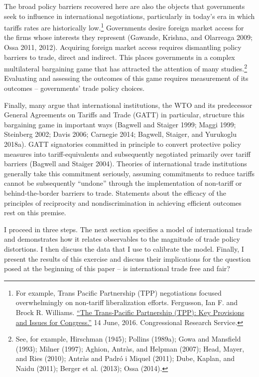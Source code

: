 \documentclass{puthesis}
\begin{document}
The broad policy barriers recovered here are also the objects that
governments seek to influence in international negotiations,
particularly in today's era in which tariffs rates are historically
low.\footnote{For example, Trans Pacific Partnership (TPP) negotiations
  focused overwhelmingly on non-tariff liberalization efforts.
  Fergusson, Ian F. and Brock R. Williams.
  \href{https://fas.org/sgp/crs/row/R44489.pdf}{``The Trans-Pacific
  Partnership (TPP): Key Provisions and Issues for Congress.''} 14 June,
  2016. Congressional Research Service.} Governments desire foreign
market access for the firms whose interests they represent (Gawande,
Krishna, and Olarreaga 2009; Ossa 2011, 2012). Acquiring foreign market
access requires dismantling policy barriers to trade, direct and
indirect. This places governments in a complex multilateral bargaining
game that has attracted the attention of many studies.\footnote{See, for
  example, Hirschman (1945); Pollins (1989a); Gowa and Mansfield (1993);
  Milner (1997); Aghion, Antràs, and Helpman (2007); Head, Mayer, and
  Ries (2010); Antràs and Padró i Miquel (2011); Dube, Kaplan, and Naidu
  (2011); Berger et al. (2013); Ossa (2014).} Evaluating and assessing
the outcomes of this game requires measurement of its outcomes --
governments' trade policy choices.

Finally, many argue that international institutions, the WTO and its
predecessor General Agreements on Tariffs and Trade (GATT) in
particular, structure this bargaining game in important ways (Bagwell
and Staiger 1999; Maggi 1999; Steinberg 2002; Davis 2006; Carnegie 2014;
Bagwell, Staiger, and Yurukoglu 2018a). GATT signatories committed in
principle to convert protective policy measures into tariff-equivalents
and subsequently negotiated primarily over tariff barriers (Bagwell and
Staiger 2004). Theories of international trade institutions generally
take this commitment seriously, assuming commitments to reduce tariffs
cannot be subsequently ``undone'' through the implementation of
non-tariff or behind-the-border barriers to trade. Statements about the
efficacy of the principles of reciprocity and nondiscrimination in
achieving efficient outcomes rest on this premise.

I proceed in three steps. The next section specifies a model of
international trade and demonstrates how it relates observables to the
magnitude of trade policy distortions. I then discuss the data that I
use to calibrate the model. Finally, I present the results of this
exercise and discuss their implications for the question posed at the
beginning of this paper -- is international trade free and fair?
\end{document}
